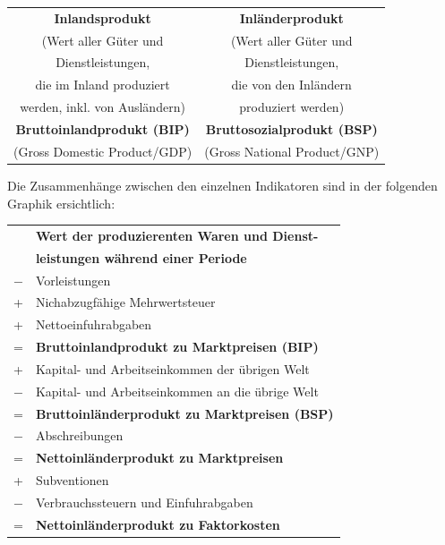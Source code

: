 \documentclass[9pt, landscape, fleqn]{scrartcl}
\begin{document}
\begin{multicols*}{3}
\begin{tabular}{| c | c |}
    \hline 
    \textbf{Inlandsprodukt} & \textbf{Inländerprodukt} \\
    (Wert aller Güter und & (Wert aller Güter und \\
    Dienstleistungen, & Dienstleistungen,\\
    die im Inland produziert & die von den Inländern \\
    werden, inkl. von Ausländern) & produziert werden)\\
    \hline
    \textbf{Bruttoinlandprodukt (BIP)} & \textbf{Bruttosozialprodukt (BSP)} \\
    (Gross Domestic Product/GDP) & (Gross National Product/GNP) \\
    \hline
\end{tabular} \newline

Die Zusammenhänge zwischen den einzelnen Indikatoren sind in der folgenden Graphik ersichtlich:

\begin{tabular*}{8.1cm}{| l  l |}
    \hline
     & \textbf{Wert der produzierenten Waren und Dienst-}\\
     & \textbf{leistungen während einer Periode} \\
     $-$ & Vorleistungen \\
     + & Nichabzugfähige Mehrwertsteuer \\
     + & Nettoeinfuhrabgaben \\
     = & \textbf{Bruttoinlandprodukt zu Marktpreisen (BIP)} \\
     \hline
    + & Kapital- und Arbeitseinkommen der übrigen Welt \\
    $-$ & Kapital- und Arbeitseinkommen an die übrige Welt \\
    = & \textbf{Bruttoinländerprodukt zu Marktpreisen (BSP)} \\
    \hline 
    $-$ & Abschreibungen \\ 
    = & \textbf{Nettoinländerprodukt zu Marktpreisen} \\
    \hline
    + & Subventionen \\
    $-$ & Verbrauchssteuern und Einfuhrabgaben \\ 
    = & \textbf{Nettoinländerprodukt zu Faktorkosten} \\
     \hline
\end{tabular*} \newline \newline \newline


\end{multicols*}
\end{document}
